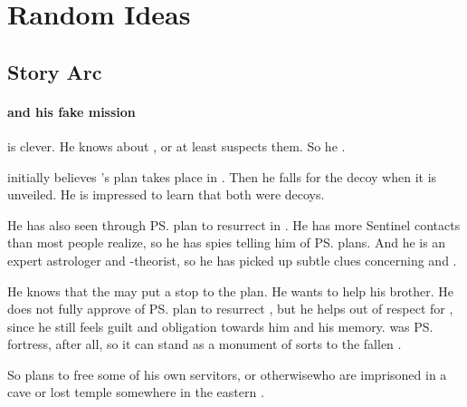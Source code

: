 \chapter{Random Ideas}












\section{\Shilred{} Story Arc}





\subsubsection[Ishnaruchaefir and his fake mission]{\Ishnaruchaefir{} and his fake mission}
\Ishnaruchaefir{} is clever. He knows about , or at least suspects them. So he . 

\Ishnaruchaefir initially believes \Secherdamon's plan takes place in \Malcur.
Then he falls for the \Forclin decoy when it is unveiled. 
He is impressed to learn that both were decoys. 

He has also seen through \ps{\Secherdamon} plan to resurrect \Nithdornazsh{} in \Malcur. 
He has more Sentinel contacts than most people realize, so he has spies telling him of \ps{\Secherdamon} plans. 
And he is an expert astrologer and \matrix-theorist, so he has picked up subtle clues concerning \Nithdornazsh{} and \Malcur. 

He knows that the \noggyaleth{} may put a stop to the plan. 
He wants to help his brother.
He does not fully approve of \ps{\Secherdamon} plan to resurrect \Nithdornazsh, but he helps out of respect for , since he still feels guilt and obligation towards him and his memory. 
\Nithd{} was \ps{\Nexagglachel}{} fortress, after all, so it can stand as a monument of sorts to the fallen \dragonking.

So \Ishnaruchaefir{} plans to free some of his own servitors\dash\pdaemons, \dragons{} or otherwise\dash who are imprisoned in a cave or lost temple somewhere in the eastern \PelidorContinent. 


